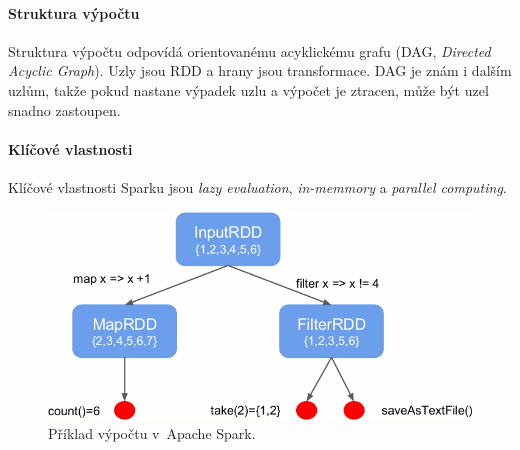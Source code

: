 \paragraph*{Struktura výpočtu} Struktura výpočtu odpovídá orientovanému acyklickému grafu (DAG, \textit{Directed Acyclic Graph}). Uzly jsou RDD a hrany jsou transformace. DAG je znám i dalším uzlům, takže pokud nastane výpadek uzlu a výpočet je ztracen, může být uzel snadno zastoupen.

\paragraph*{Klíčové vlastnosti} Klíčové vlastnosti Sparku jsou \textit{lazy evaluation}, \textit{in-memmory} a \textit{parallel computing}.

\begin{figure}[H]
    \centering
    \includegraphics[width=0.85\linewidth]{spark_example.png}
    \caption{Příklad výpočtu v~Apache Spark.}
\end{figure}
